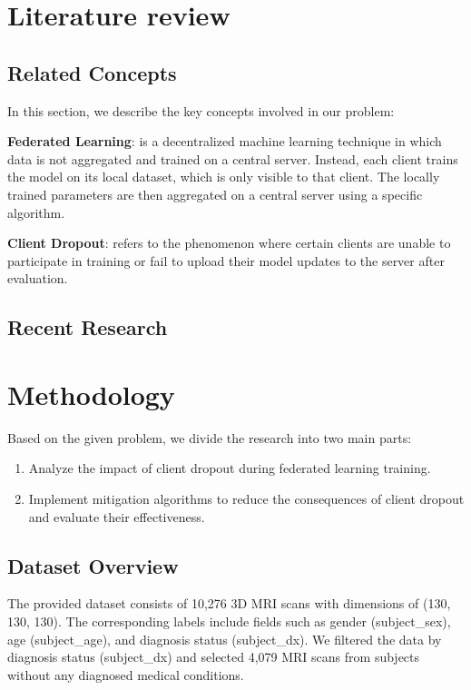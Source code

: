 \documentclass[12pt, a4paper]{article}
\begin{document}
\section{Literature review}


\subsection{Related Concepts}

In this section, we describe the key concepts involved in our problem:

\textbf{Federated Learning}: is a decentralized machine learning technique in which data is not aggregated and trained on a central server. Instead, each client trains the model on its local dataset, which is only visible to that client. The locally trained parameters are then aggregated on a central server using a specific algorithm.

\textbf{Client Dropout}: refers to the phenomenon where certain clients are unable to participate in training or fail to upload their model updates to the server after evaluation.

\subsection{Recent Research}

\section{Methodology}

Based on the given problem, we divide the research into two main parts:

\begin{enumerate}
    \item Analyze the impact of client dropout during federated learning training.
    \item Implement mitigation algorithms to reduce the consequences of client dropout and evaluate their effectiveness.
\end{enumerate}

\subsection{Dataset Overview}

The provided dataset consists of 10,276 3D MRI scans with dimensions of (130, 130, 130). The corresponding labels include fields such as gender (subject\_sex), age (subject\_age), and diagnosis status (subject\_dx). We filtered the data by diagnosis status (subject\_dx) and selected 4,079 MRI scans from subjects without any diagnosed medical conditions.
\end{document}
